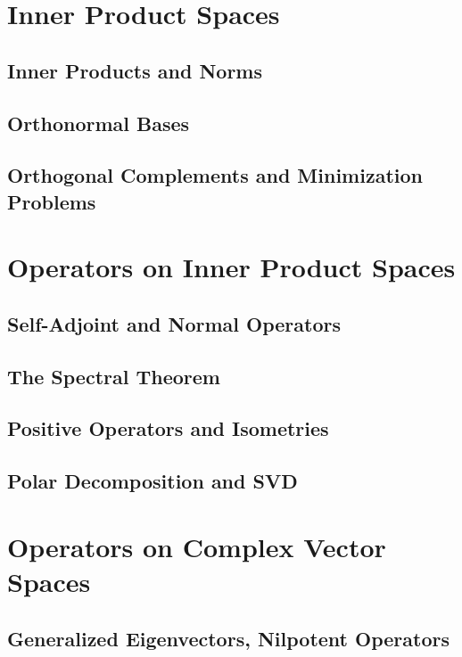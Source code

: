 \documentclass[11pt, letterpaper]{article}
\begin{document}
\newpage
\section{Inner Product Spaces}
\subsection{Inner Products and Norms}

\newpage
\subsection{Orthonormal Bases}

\newpage
\subsection{Orthogonal Complements and Minimization Problems}

\newpage
\section{Operators on Inner Product Spaces}
\subsection{Self-Adjoint and Normal Operators}

\newpage
\subsection{The Spectral Theorem}

\newpage
\subsection{Positive Operators and Isometries}

\newpage
\subsection{Polar Decomposition and SVD}

\newpage
\section{Operators on Complex Vector Spaces}
\subsection{Generalized Eigenvectors, Nilpotent Operators}
\end{document}
